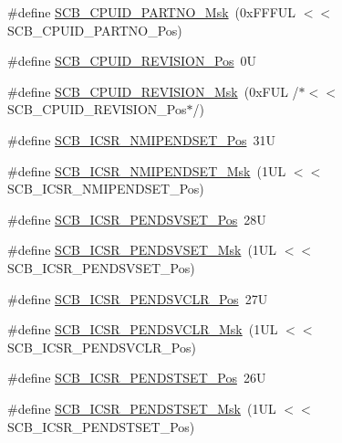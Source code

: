 \begin{DoxyCompactItemize}
\item 
\#define \mbox{\hyperlink{group___c_m_s_i_s___s_c_b_ga98e581423ca016680c238c469aba546d}{S\+C\+B\+\_\+\+C\+P\+U\+I\+D\+\_\+\+P\+A\+R\+T\+N\+O\+\_\+\+Msk}}~(0x\+F\+F\+F\+U\+L $<$$<$ S\+C\+B\+\_\+\+C\+P\+U\+I\+D\+\_\+\+P\+A\+R\+T\+N\+O\+\_\+\+Pos)
\item 
\#define \mbox{\hyperlink{group___c_m_s_i_s___s_c_b_ga3c3d9071e574de11fb27ba57034838b1}{S\+C\+B\+\_\+\+C\+P\+U\+I\+D\+\_\+\+R\+E\+V\+I\+S\+I\+O\+N\+\_\+\+Pos}}~0U
\item 
\#define \mbox{\hyperlink{group___c_m_s_i_s___s_c_b_ga2ec0448b6483f77e7f5d08b4b81d85df}{S\+C\+B\+\_\+\+C\+P\+U\+I\+D\+\_\+\+R\+E\+V\+I\+S\+I\+O\+N\+\_\+\+Msk}}~(0x\+F\+U\+L /$\ast$$<$$<$ S\+C\+B\+\_\+\+C\+P\+U\+I\+D\+\_\+\+R\+E\+V\+I\+S\+I\+O\+N\+\_\+\+Pos$\ast$/)
\item 
\#define \mbox{\hyperlink{group___c_m_s_i_s___s_c_b_ga750d4b52624a46d71356db4ea769573b}{S\+C\+B\+\_\+\+I\+C\+S\+R\+\_\+\+N\+M\+I\+P\+E\+N\+D\+S\+E\+T\+\_\+\+Pos}}~31U
\item 
\#define \mbox{\hyperlink{group___c_m_s_i_s___s_c_b_ga340e3f79e9c3607dee9f2c048b6b22e8}{S\+C\+B\+\_\+\+I\+C\+S\+R\+\_\+\+N\+M\+I\+P\+E\+N\+D\+S\+E\+T\+\_\+\+Msk}}~(1\+U\+L $<$$<$ S\+C\+B\+\_\+\+I\+C\+S\+R\+\_\+\+N\+M\+I\+P\+E\+N\+D\+S\+E\+T\+\_\+\+Pos)
\item 
\#define \mbox{\hyperlink{group___c_m_s_i_s___s_c_b_gab5ded23d2ab1d5ff7cc7ce746205e9fe}{S\+C\+B\+\_\+\+I\+C\+S\+R\+\_\+\+P\+E\+N\+D\+S\+V\+S\+E\+T\+\_\+\+Pos}}~28U
\item 
\#define \mbox{\hyperlink{group___c_m_s_i_s___s_c_b_ga1e40d93efb402763c8c00ddcc56724ff}{S\+C\+B\+\_\+\+I\+C\+S\+R\+\_\+\+P\+E\+N\+D\+S\+V\+S\+E\+T\+\_\+\+Msk}}~(1\+U\+L $<$$<$ S\+C\+B\+\_\+\+I\+C\+S\+R\+\_\+\+P\+E\+N\+D\+S\+V\+S\+E\+T\+\_\+\+Pos)
\item 
\#define \mbox{\hyperlink{group___c_m_s_i_s___s_c_b_gae218d9022288f89faf57187c4d542ecd}{S\+C\+B\+\_\+\+I\+C\+S\+R\+\_\+\+P\+E\+N\+D\+S\+V\+C\+L\+R\+\_\+\+Pos}}~27U
\item 
\#define \mbox{\hyperlink{group___c_m_s_i_s___s_c_b_ga4a901ace381d3c1c74ac82b22fae2e1e}{S\+C\+B\+\_\+\+I\+C\+S\+R\+\_\+\+P\+E\+N\+D\+S\+V\+C\+L\+R\+\_\+\+Msk}}~(1\+U\+L $<$$<$ S\+C\+B\+\_\+\+I\+C\+S\+R\+\_\+\+P\+E\+N\+D\+S\+V\+C\+L\+R\+\_\+\+Pos)
\item 
\#define \mbox{\hyperlink{group___c_m_s_i_s___s_c_b_ga9dbb3358c6167c9c3f85661b90fb2794}{S\+C\+B\+\_\+\+I\+C\+S\+R\+\_\+\+P\+E\+N\+D\+S\+T\+S\+E\+T\+\_\+\+Pos}}~26U
\item 
\#define \mbox{\hyperlink{group___c_m_s_i_s___s_c_b_ga7325b61ea0ec323ef2d5c893b112e546}{S\+C\+B\+\_\+\+I\+C\+S\+R\+\_\+\+P\+E\+N\+D\+S\+T\+S\+E\+T\+\_\+\+Msk}}~(1\+U\+L $<$$<$ S\+C\+B\+\_\+\+I\+C\+S\+R\+\_\+\+P\+E\+N\+D\+S\+T\+S\+E\+T\+\_\+\+Pos)
$$
\end{DoxyCompactItemize}
